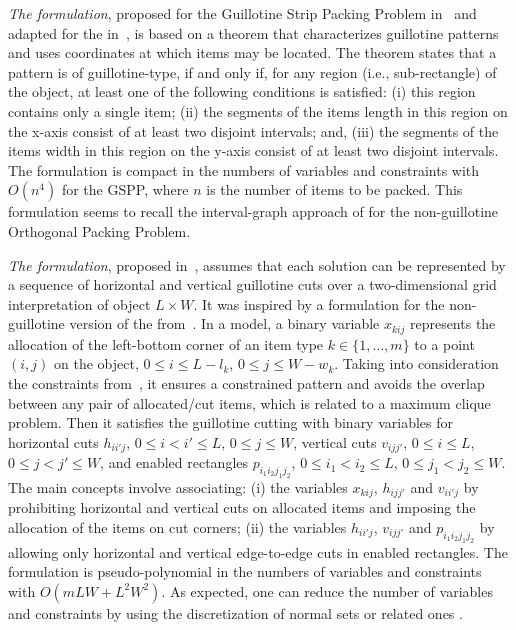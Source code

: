 \emph{The {\modelBCE} formulation}, proposed for the Guillotine Strip Packing Problem in~\citet{messaoud:2008} and adapted for the {\myproblem} in~\citet{martin:2020}, is based on a theorem that characterizes guillotine patterns and uses coordinates at which items may be located.
The theorem states that a pattern is of guillotine-type, if and only if, for any region (i.e., sub-rectangle) of the object, at least one of the following conditions is satisfied:
(i) this region contains only a single item;
(ii) the segments of the items length in this region on the x-axis consist of at least two disjoint intervals; and,
(iii) the segments of the items width in this region on the y-axis consist of at least two disjoint intervals.
The formulation is compact in the numbers of variables and constraints with \(O(n^4)\) for the GSPP, where $n$ is the number of items to be packed.
This formulation seems to recall the interval-graph approach of \citet{fekete:1997} for the non-guillotine Orthogonal Packing Problem.

\emph{The {\modelGrid} formulation}, proposed in~\citet{martin:2020}, assumes that each solution can be represented by a sequence of horizontal and vertical guillotine cuts over a two-dimensional grid interpretation of object $L \times W$.
It was inspired by a formulation for the non-guillotine version of the {\myproblem} from~\citet{beasley:1985:nonguillotine}.
In a {\modelGrid} model, a binary variable $x_{kij}$ represents the allocation of the left-bottom corner of an item type $k \in \{1,\ldots,m\}$ to a point $(i,j)$ on the object, $0 \leq i \leq L-l_k$, $0 \leq j \leq W-w_k$.
Taking into consideration the constraints from~\citet{beasley:1985:nonguillotine}, it ensures a constrained pattern and avoids the overlap between any pair of allocated/cut items, which is related to a maximum clique problem.
Then it satisfies the guillotine cutting with binary variables for horizontal cuts $h_{ii'j}$, $0 \leq i < i' \leq L$, $0 \leq j \leq W$, vertical cuts $v_{ijj'}$, $0 \leq i \leq L$, $0 \leq j < j' \leq W$, and enabled rectangles $p_{i_1 i_2 j_1 j_2}$, $0 \leq i_1 < i_2 \leq L$, $0 \leq j_1 < j_2 \leq W$.
The main concepts involve associating: 
(i) the variables $x_{kij}$, $h_{ijj'}$ and $v_{ii'j}$ by prohibiting horizontal and vertical cuts on allocated items and imposing the allocation of the items on cut corners; 
(ii) the variables $h_{ii'j}$, $v_{ijj'}$ and $p_{i_1 i_2 j_1 j_2}$ by allowing only horizontal and vertical edge-to-edge cuts in enabled rectangles.
The formulation is pseudo-polynomial in the numbers of variables and constraints with \(O(mLW+L^2W^2)\).
As expected, one can reduce the number of variables and constraints by using the discretization of normal sets or related ones \citet{herz:1972,cw:1977}.

